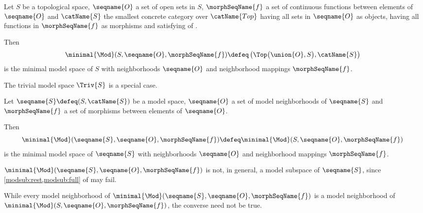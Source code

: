 \documentclass{article}
\begin{document}
\begin{definition}
\label{def:minmod}
Let $S$ be a topological space, $\seqname{O}$ a set of open sets in $S$,
$\morphSeqName{f}$ a set of continuous functions between elements of
$\seqname{O}$ and $\catName{S}$ the smallest concrete category  over
$\catName{Top}$ having all sets in $\seqname{O}$ as objects, having all
functions in $\morphSeqName{f}$ as morphisms and satisfying
 of
{
  \showlabelsinline
}.

Then
\begin{equation}
\minimal{\Mod}
  (
    S,
    \seqname{O},
    \morphSeqName{f}
  )
\defeq
  \left (
    \Top \bigl ( \union{O}, S \bigr ),
    \catName{S}
  \right )
\end{equation}
is the minimal model space of $S$ with neighborhoods $\seqname{O}$ and
neighborhood mappings $\morphSeqName{f}$.
\begin{remark}
The trivial model space $\Triv{S}$ is a special case.
\end{remark}

Let $\seqname{S} \defeq (S, \catName{S})$ be a model space,
$\seqname{O}$ a set of model neighborhoods of $\seqname{S}$ and
$\morphSeqName{f}$ a set of morphisms between elements of $\seqname{O}$.

Then
\begin{equation}
\minimal{\Mod}
  (
    \seqname{S},
    \seqname{O},
    \morphSeqName{f}
  )
\defeq
\minimal{\Mod}
  (
    S,
    \seqname{O},
    \morphSeqName{f}
  )
\end{equation}
is the minimal model space of $\seqname{S}$ with neighborhoods
$\seqname{O}$ and neighborhood mappings $\morphSeqName{f}$.

\begin{remark}
$
  \minimal{\Mod}
    (
      \seqname{S},
      \seqname{O},
      \morphSeqName{f}
    )
$
is not, in general, a model subspace of $\seqname{S}$, since
{
  \showlabelsinline
  \cref{modsub:rest,modsub:full}
}
of  may fail.

While every model neighborhood of
$\minimal{\Mod}(\seqname{S}, \seqname{O}, \morphSeqName{f})$
is a model neighborhood of
$\minimal{\Mod}(S, \seqname{O}, \morphSeqName{f})$, the converse need not
be true.

\end{remark}
\end{definition}
\end{document}
